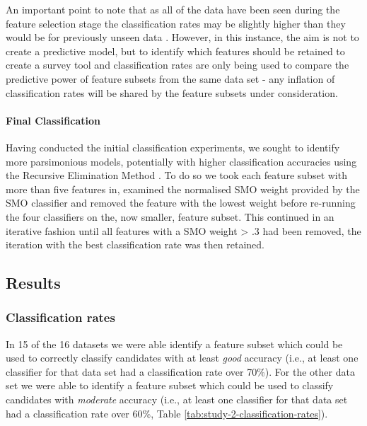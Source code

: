 \documentclass[a4paper,]{book}
\let\oldparagraph\paragraph
\renewcommand{\paragraph}[1]{\oldparagraph{#1}\mbox{}}
\begin{document}
An important point to note that as all of the data have been seen during the feature selection stage the classification rates may be slightly higher than they would be for previously unseen data \citep{Kuncheva2018, Smialowski2010}. However, in this instance, the aim is not to create a predictive model, but to identify which features should be retained to create a survey tool and classification rates are only being used to compare the predictive power of feature subsets from the same data set - any inflation of classification rates will be shared by the feature subsets under consideration.

\hypertarget{final-classification-1}{%
\paragraph{Final Classification}\label{final-classification-1}}

Having conducted the initial classification experiments, we sought to identify more parsimonious models, potentially with higher classification accuracies using the Recursive Elimination Method \citep{Guyon2002}. To do so we took each feature subset with more than five features in, examined the normalised SMO weight provided by the SMO classifier and removed the feature with the lowest weight before re-running the four classifiers on the, now smaller, feature subset. This continued in an iterative fashion until all features with a SMO weight \textgreater{} .3 had been removed, the iteration with the best classification rate was then retained.

\hypertarget{results-3}{%
\subsection{Results}\label{results-3}}

\hypertarget{classification-rates}{%
\subsubsection{Classification rates}\label{classification-rates}}

In 15 of the 16 datasets we were able identify a feature subset which could be used to correctly classify candidates with at least \emph{good} accuracy (i.e., at least one classifier for that data set had a classification rate over 70\%). For the other data set we were able to identify a feature subset which could be used to classify candidates with \emph{moderate} accuracy (i.e., at least one classifier for that data set had a classification rate over 60\%, Table \ref{tab:study-2-classification-rates}).
\end{document}
